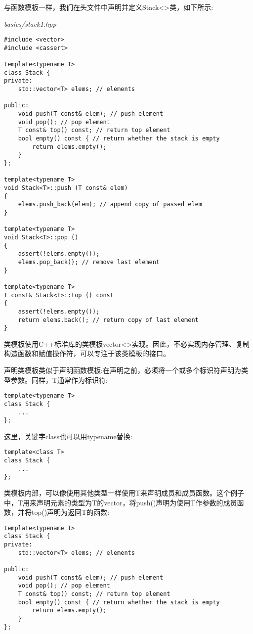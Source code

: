
与函数模板一样，我们在头文件中声明并定义Stack<>类，如下所示:

\noindent
\textit{basics/stack1.hpp}
\begin{lstlisting}[style=styleCXX]
#include <vector>
#include <cassert>

template<typename T>
class Stack {
private:
	std::vector<T> elems; // elements
	
public:
	void push(T const& elem); // push element
	void pop(); // pop element
	T const& top() const; // return top element
	bool empty() const { // return whether the stack is empty
		return elems.empty();
	}
};

template<typename T>
void Stack<T>::push (T const& elem)
{
	elems.push_back(elem); // append copy of passed elem
}

template<typename T>
void Stack<T>::pop ()
{
	assert(!elems.empty());
	elems.pop_back(); // remove last element
}

template<typename T>
T const& Stack<T>::top () const
{
	assert(!elems.empty());
	return elems.back(); // return copy of last element
}
\end{lstlisting}

类模板使用C++标准库的类模板vector<>实现。因此，不必实现内存管理、复制构造函数和赋值操作符，可以专注于该类模板的接口。


声明类模板类似于声明函数模板:在声明之前，必须将一个或多个标识符声明为类型参数。同样，T通常作为标识符:

\begin{lstlisting}[style=styleCXX]
template<typename T>
class Stack {
	...
};
\end{lstlisting}

这里，关键字class也可以用typename替换:

\begin{lstlisting}[style=styleCXX]
template<class T>
class Stack {
	...
};
\end{lstlisting}

类模板内部，可以像使用其他类型一样使用T来声明成员和成员函数。这个例子中，T用来声明元素的类型为T的vector，将push()声明为使用T作参数的成员函数，并将top()声明为返回T的函数:

\begin{lstlisting}[style=styleCXX]
template<typename T>
class Stack {
private:
	std::vector<T> elems; // elements
	
public:
	void push(T const& elem); // push element
	void pop(); // pop element
	T const& top() const; // return top element
	bool empty() const { // return whether the stack is empty
		return elems.empty();
	}
};
\end{lstlisting}

